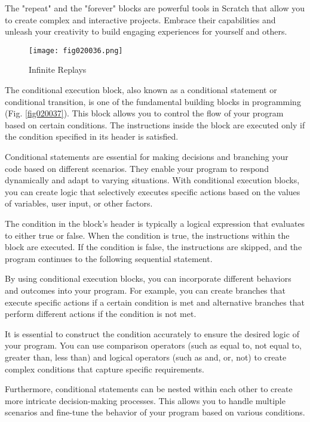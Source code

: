 The "repeat" and the "forever" blocks are powerful tools in Scratch that allow you to create complex and interactive projects. Embrace their capabilities and unleash your creativity to build engaging experiences for yourself and others.

\begin{figure}[H]
   \centering
   \texttt{[image: fig020036.png]}
   \caption{Infinite Replays}
\label{fig020036}
\end{figure}

The conditional execution block, also known as a conditional statement or conditional transition, is one of the fundamental building blocks in programming (Fig. \ref{fig020037}). This block allows you to control the flow of your program based on certain conditions. The instructions inside the block are executed only if the condition specified in its header is satisfied.

Conditional statements are essential for making decisions and branching your code based on different scenarios. They enable your program to respond dynamically and adapt to varying situations. With conditional execution blocks, you can create logic that selectively executes specific actions based on the values of variables, user input, or other factors.

The condition in the block's header is typically a logical expression that evaluates to either true or false. When the condition is true, the instructions within the block are executed. If the condition is false, the instructions are skipped, and the program continues to the following sequential statement.

By using conditional execution blocks, you can incorporate different behaviors and outcomes into your program. For example, you can create branches that execute specific actions if a certain condition is met and alternative branches that perform different actions if the condition is not met.

It is essential to construct the condition accurately to ensure the desired logic of your program. You can use comparison operators (such as equal to, not equal to, greater than, less than) and logical operators (such as and, or, not) to create complex conditions that capture specific requirements.

Furthermore, conditional statements can be nested within each other to create more intricate decision-making processes. This allows you to handle multiple scenarios and fine-tune the behavior of your program based on various conditions.

